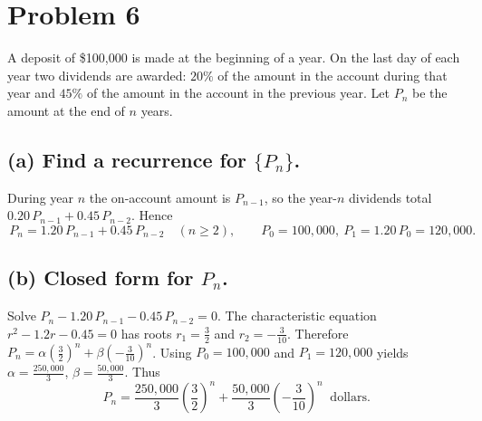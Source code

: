 \section*{Problem 6}
A deposit of \$100{,}000 is made at the beginning of a year. On the last day of each
year two dividends are awarded: $20\%$ of the amount in the account during that year and
$45\%$ of the amount in the account in the previous year. Let $P_n$ be the amount at the end of $n$ years.

\subsection*{(a) Find a recurrence for $\{P_n\}$.}
During year $n$ the on-account amount is $P_{n-1}$, so the year-$n$ dividends total
$0.20\,P_{n-1}+0.45\,P_{n-2}$. Hence
\[
\boxed{\,P_n=1.20\,P_{n-1}+0.45\,P_{n-2}\quad(n\ge2),\qquad
P_0=100{,}000,\ P_1=1.20\,P_0=120{,}000.\,}
\]

\subsection*{(b) Closed form for $P_n$.}
Solve $P_n-1.20\,P_{n-1}-0.45\,P_{n-2}=0$.
The characteristic equation $r^2-1.2r-0.45=0$ has roots $r_1=\tfrac32$ and $r_2=-\tfrac{3}{10}$.
Therefore $P_n=\alpha\left(\tfrac32\right)^n+\beta\left(-\tfrac{3}{10}\right)^n$.
Using $P_0=100{,}000$ and $P_1=120{,}000$ yields $\alpha=\tfrac{250{,}000}{3}$, $\beta=\tfrac{50{,}000}{3}$.
Thus
\[
\boxed{\,P_n=\frac{250{,}000}{3}\left(\frac32\right)^n+\frac{50{,}000}{3}\left(-\frac{3}{10}\right)^n\ \text{ dollars}.}
\]
